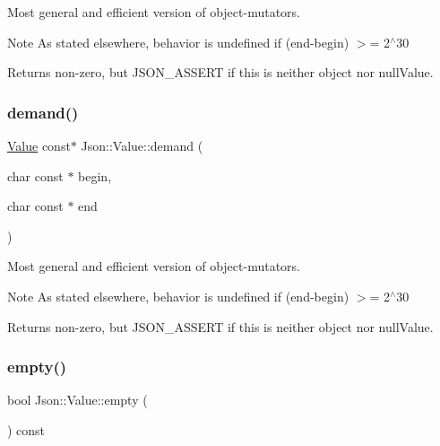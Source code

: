 Most general and efficient version of object-\/mutators. \begin{DoxyNote}{Note}
As stated elsewhere, behavior is undefined if (end-\/begin) $>$= 2$^\wedge$30 
\end{DoxyNote}
\begin{DoxyReturn}{Returns}
non-\/zero, but J\+S\+O\+N\+\_\+\+A\+S\+S\+E\+RT if this is neither object nor null\+Value. 
\end{DoxyReturn}
\hypertarget{class_json_1_1_value_afeb7ff596a0929d90c5f2f3cffb413ed}{}\label{class_json_1_1_value_afeb7ff596a0929d90c5f2f3cffb413ed} 
\subsubsection{\texorpdfstring{demand()}{demand()}\hspace{0.1cm}{\footnotesize\ttfamily [2/2]}}
{\footnotesize\ttfamily \hyperlink{class_json_1_1_value}{Value} const$\ast$ Json\+::\+Value\+::demand (\begin{DoxyParamCaption}\item[{char const $\ast$}]{begin,  }\item[{char const $\ast$}]{end }\end{DoxyParamCaption})}

Most general and efficient version of object-\/mutators. \begin{DoxyNote}{Note}
As stated elsewhere, behavior is undefined if (end-\/begin) $>$= 2$^\wedge$30 
\end{DoxyNote}
\begin{DoxyReturn}{Returns}
non-\/zero, but J\+S\+O\+N\+\_\+\+A\+S\+S\+E\+RT if this is neither object nor null\+Value. 
\end{DoxyReturn}
\hypertarget{class_json_1_1_value_a0519a551e37ee6665d74742b3f96bab3}{}\label{class_json_1_1_value_a0519a551e37ee6665d74742b3f96bab3} 
\subsubsection{\texorpdfstring{empty()}{empty()}\hspace{0.1cm}{\footnotesize\ttfamily [1/2]}}
{\footnotesize\ttfamily bool Json\+::\+Value\+::empty (\begin{DoxyParamCaption}{ }\end{DoxyParamCaption}) const}



